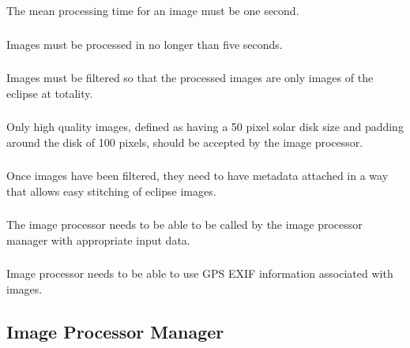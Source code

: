 \documentclass[10pt, onecolumn, draftclsnofoot, letterpaper, compsoc]{IEEEtran}
\begin{document}
The mean processing time for an image must be one second. \\

\subsubsection{} 

Images must be processed in no longer than five seconds.\\

\subsubsection{} 

Images must be filtered so that the processed images are only images of the
eclipse at totality.\\

\subsubsection{}

Only high quality images, defined as having a 50 pixel solar disk size and
padding around the disk of 100 pixels, should be accepted by the image
processor.\\

\subsubsection{} 

Once images have been filtered, they need to have metadata attached in a way
that allows easy stitching of eclipse images. \\

\subsubsection{} 

The image processor needs to be able to be called by the image processor manager
with appropriate input data. \\

\subsubsection{} 

Image processor needs to be able to use GPS EXIF information associated with
images.\\

\subsection{Image Processor Manager}
\end{document}
